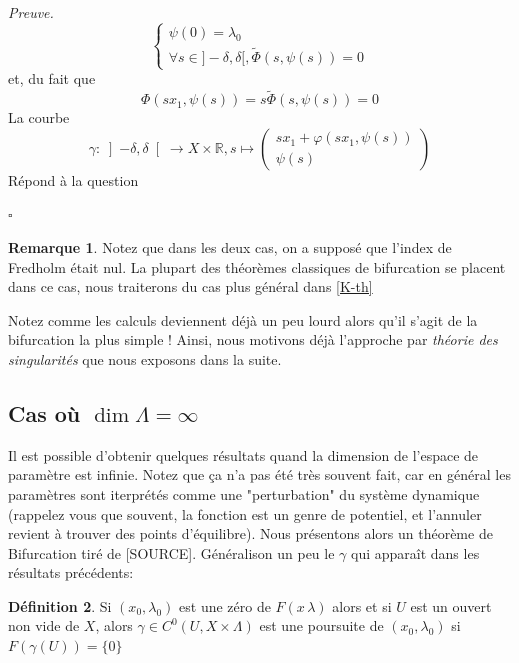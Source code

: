 \documentclass[a4paper,12pt,oneside,titlepage]{article}
\renewcommand{\tilde}[1]{\widetilde{#1}}
\newcommand{\R}[0]{\mathbb{R}}
\theoremstyle{definition}
\newtheorem{definition}{Définition}[section]
\newtheorem{remarque}[definition]{Remarque}
\theoremstyle{plain}
\newenvironment{preuve}
{\par\noindent\textit{Preuve.}\ }
{\hfill$\square$\par}
\begin{document}
\begin{preuve}
\begin{equation*}
        \begin{cases}
            \psi(0)=\lambda_0
            \\ \forall s\in ]-\delta,\delta [, \tilde{\Phi}(s,\psi(s))=0 
        \end{cases}
    \end{equation*}
et, du fait que 
\begin{equation*}
    \Phi(sx_1,\psi(s))=s\tilde{\Phi}(s,\psi(s))=0 
\end{equation*}
La courbe
    \begin{equation*}
        \gamma : \left] -\delta,\delta\right[\rightarrow X\times \R ,s\mapsto
                    \begin{pmatrix}
                    sx_1+\varphi(sx_1,\psi(s))\\
                    \psi(s)
                    \end{pmatrix}
    \end{equation*}
Répond à la question

\end{preuve}
\begin{remarque}\label{remarque IND=0}
    Notez que dans les deux cas, on a supposé que l'index de Fredholm était nul. La plupart des théorèmes classiques de bifurcation se placent dans ce cas, nous traiterons du cas plus général dans \ref{K-th}
\end{remarque}
Notez comme les calculs deviennent déjà un peu lourd alors qu'il s'agit de la bifurcation la plus simple ! Ainsi, nous motivons déjà l'approche par \textit{théorie des singularités} que nous exposons dans la suite. 
\subsection{Cas où $\dim \Lambda=\infty$}
Il est possible d'obtenir quelques résultats quand la dimension de l'espace de paramètre est infinie. Notez que ça n'a pas été très souvent fait, car en général les paramètres sont iterprétés comme une "perturbation" du système dynamique (rappelez vous que souvent, la fonction est un genre de potentiel,  et l'annuler revient à trouver des points d'équilibre). Nous présentons alors un théorème de Bifurcation tiré de [SOURCE].
Généralison un peu le $\gamma$ qui apparaît dans les résultats précédents:

\begin{definition}
    Si $(x_0,\lambda_0)$ est une zéro de $F(x\,\lambda)$ alors et si $U$ est un ouvert non vide de $X$, alors $\gamma\in C^0(U,X\times\Lambda)$ est une poursuite de $(x_0,\lambda_0)$ si $F(\gamma(U))=\{0\}$ 
\end{definition}
\end{document}
